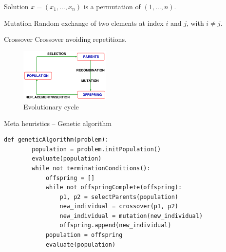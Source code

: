 \begin{example}
    Solution $x = (x_1, \dots, x_n)$ is a permutation of $(1, \dots, n)$.
    \begin{descriptionlist}
        \item[Mutation] Random exchange of two elements at index $i$ and $j$, with $i \neq j$.
        \item[Crossover] Crossover avoiding repetitions.
    \end{descriptionlist}
\end{example}

\begin{figure}[ht]
    \centering
    \includegraphics[width=0.4\textwidth]{img/_genetic_cycle.pdf}
    \caption{Evolutionary cycle}
\end{figure}

\begin{algorithm}
\caption{Meta heuristics -- Genetic algorithm}
\begin{lstlisting}[mathescape=true]
    def geneticAlgorithm(problem):
        population = problem.initPopulation()
        evaluate(population)
        while not terminationConditions():
            offspring = []
            while not offspringComplete(offspring):
                p1, p2 = selectParents(population)
                new_individual = crossover(p1, p2)
                new_individual = mutation(new_individual)
                offspring.append(new_individual)
            population = offspring
            evaluate(population)
\end{lstlisting}
\end{algorithm}
